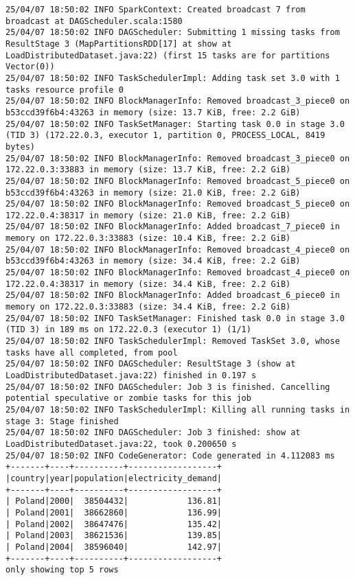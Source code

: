 \documentclass{article}
\begin{document}
\begin{verbatim}
25/04/07 18:50:02 INFO SparkContext: Created broadcast 7 from broadcast at DAGScheduler.scala:1580
25/04/07 18:50:02 INFO DAGScheduler: Submitting 1 missing tasks from ResultStage 3 (MapPartitionsRDD[17] at show at LoadDistributedDataset.java:22) (first 15 tasks are for partitions Vector(0))
25/04/07 18:50:02 INFO TaskSchedulerImpl: Adding task set 3.0 with 1 tasks resource profile 0
25/04/07 18:50:02 INFO BlockManagerInfo: Removed broadcast_3_piece0 on b53ccd39f6b4:43263 in memory (size: 13.7 KiB, free: 2.2 GiB)
25/04/07 18:50:02 INFO TaskSetManager: Starting task 0.0 in stage 3.0 (TID 3) (172.22.0.3, executor 1, partition 0, PROCESS_LOCAL, 8419 bytes) 
25/04/07 18:50:02 INFO BlockManagerInfo: Removed broadcast_3_piece0 on 172.22.0.3:33883 in memory (size: 13.7 KiB, free: 2.2 GiB)
25/04/07 18:50:02 INFO BlockManagerInfo: Removed broadcast_5_piece0 on b53ccd39f6b4:43263 in memory (size: 21.0 KiB, free: 2.2 GiB)
25/04/07 18:50:02 INFO BlockManagerInfo: Removed broadcast_5_piece0 on 172.22.0.4:38317 in memory (size: 21.0 KiB, free: 2.2 GiB)
25/04/07 18:50:02 INFO BlockManagerInfo: Added broadcast_7_piece0 in memory on 172.22.0.3:33883 (size: 10.4 KiB, free: 2.2 GiB)
25/04/07 18:50:02 INFO BlockManagerInfo: Removed broadcast_4_piece0 on b53ccd39f6b4:43263 in memory (size: 34.4 KiB, free: 2.2 GiB)
25/04/07 18:50:02 INFO BlockManagerInfo: Removed broadcast_4_piece0 on 172.22.0.4:38317 in memory (size: 34.4 KiB, free: 2.2 GiB)
25/04/07 18:50:02 INFO BlockManagerInfo: Added broadcast_6_piece0 in memory on 172.22.0.3:33883 (size: 34.4 KiB, free: 2.2 GiB)
25/04/07 18:50:02 INFO TaskSetManager: Finished task 0.0 in stage 3.0 (TID 3) in 189 ms on 172.22.0.3 (executor 1) (1/1)
25/04/07 18:50:02 INFO TaskSchedulerImpl: Removed TaskSet 3.0, whose tasks have all completed, from pool 
25/04/07 18:50:02 INFO DAGScheduler: ResultStage 3 (show at LoadDistributedDataset.java:22) finished in 0.197 s
25/04/07 18:50:02 INFO DAGScheduler: Job 3 is finished. Cancelling potential speculative or zombie tasks for this job
25/04/07 18:50:02 INFO TaskSchedulerImpl: Killing all running tasks in stage 3: Stage finished
25/04/07 18:50:02 INFO DAGScheduler: Job 3 finished: show at LoadDistributedDataset.java:22, took 0.200650 s
25/04/07 18:50:02 INFO CodeGenerator: Code generated in 4.112083 ms
+-------+----+----------+------------------+
|country|year|population|electricity_demand|
+-------+----+----------+------------------+
| Poland|2000|  38504432|            136.81|
| Poland|2001|  38662860|            136.99|
| Poland|2002|  38647476|            135.42|
| Poland|2003|  38621536|            139.85|
| Poland|2004|  38596040|            142.97|
+-------+----+----------+------------------+
only showing top 5 rows


\end{verbatim}
\end{document}

